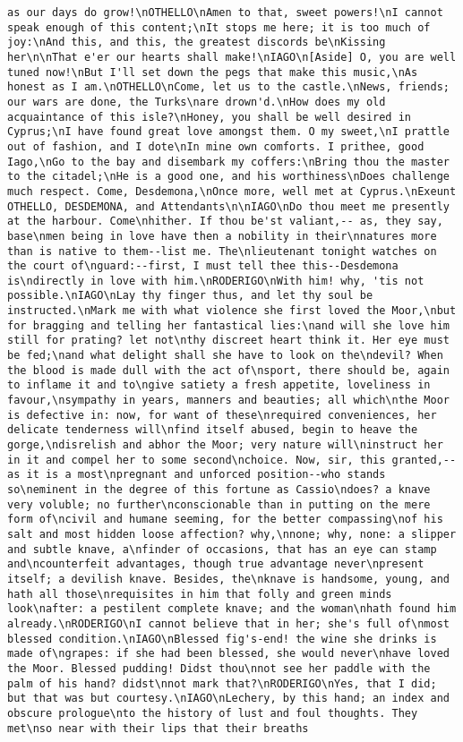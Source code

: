 \begin{verbatim}
as our days do grow!\nOTHELLO\nAmen to that, sweet powers!\nI cannot speak enough of this content;\nIt stops me here; it is too much of joy:\nAnd this, and this, the greatest discords be\nKissing her\n\nThat e'er our hearts shall make!\nIAGO\n[Aside] O, you are well tuned now!\nBut I'll set down the pegs that make this music,\nAs honest as I am.\nOTHELLO\nCome, let us to the castle.\nNews, friends; our wars are done, the Turks\nare drown'd.\nHow does my old acquaintance of this isle?\nHoney, you shall be well desired in Cyprus;\nI have found great love amongst them. O my sweet,\nI prattle out of fashion, and I dote\nIn mine own comforts. I prithee, good Iago,\nGo to the bay and disembark my coffers:\nBring thou the master to the citadel;\nHe is a good one, and his worthiness\nDoes challenge much respect. Come, Desdemona,\nOnce more, well met at Cyprus.\nExeunt OTHELLO, DESDEMONA, and Attendants\n\nIAGO\nDo thou meet me presently at the harbour. Come\nhither. If thou be'st valiant,-- as, they say, base\nmen being in love have then a nobility in their\nnatures more than is native to them--list me. The\nlieutenant tonight watches on the court of\nguard:--first, I must tell thee this--Desdemona is\ndirectly in love with him.\nRODERIGO\nWith him! why, 'tis not possible.\nIAGO\nLay thy finger thus, and let thy soul be instructed.\nMark me with what violence she first loved the Moor,\nbut for bragging and telling her fantastical lies:\nand will she love him still for prating? let not\nthy discreet heart think it. Her eye must be fed;\nand what delight shall she have to look on the\ndevil? When the blood is made dull with the act of\nsport, there should be, again to inflame it and to\ngive satiety a fresh appetite, loveliness in favour,\nsympathy in years, manners and beauties; all which\nthe Moor is defective in: now, for want of these\nrequired conveniences, her delicate tenderness will\nfind itself abused, begin to heave the gorge,\ndisrelish and abhor the Moor; very nature will\ninstruct her in it and compel her to some second\nchoice. Now, sir, this granted,--as it is a most\npregnant and unforced position--who stands so\neminent in the degree of this fortune as Cassio\ndoes? a knave very voluble; no further\nconscionable than in putting on the mere form of\ncivil and humane seeming, for the better compassing\nof his salt and most hidden loose affection? why,\nnone; why, none: a slipper and subtle knave, a\nfinder of occasions, that has an eye can stamp and\ncounterfeit advantages, though true advantage never\npresent itself; a devilish knave. Besides, the\nknave is handsome, young, and hath all those\nrequisites in him that folly and green minds look\nafter: a pestilent complete knave; and the woman\nhath found him already.\nRODERIGO\nI cannot believe that in her; she's full of\nmost blessed condition.\nIAGO\nBlessed fig's-end! the wine she drinks is made of\ngrapes: if she had been blessed, she would never\nhave loved the Moor. Blessed pudding! Didst thou\nnot see her paddle with the palm of his hand? didst\nnot mark that?\nRODERIGO\nYes, that I did; but that was but courtesy.\nIAGO\nLechery, by this hand; an index and obscure prologue\nto the history of lust and foul thoughts. They met\nso near with their lips that their breaths 
\end{verbatim}
